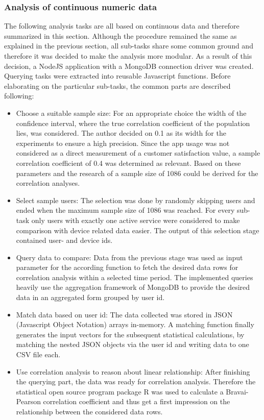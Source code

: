 \subsubsection{Analysis of continuous numeric data}
The following analysis tasks are all based on continuous data and therefore summarized in this section. Although the procedure remained the same as explained in the previous section, all sub-tasks share some common ground and therefore it was decided to make the analysis more modular. As a result of this decision, a NodeJS application with a MongoDB connection driver was created. Querying tasks were extracted into reusable Javascript functions. Before elaborating on the particular sub-tasks, the common parts are described following:

\begin{itemize}
	\item Choose a suitable sample size: For an appropriate choice the width of the confidence interval, where the true correlation coefficient of the population lies, was considered. The author decided on 0.1 as its width for the experiments to ensure a high precision. Since the app usage was not considered as a direct measurement of a customer satisfaction value, a sample correlation coefficient of 0.4 was determined as relevant. Based on these parameters and the research of \cite{moinester2014sample} a sample size of 1086 could be derived for the correlation analyses. 
	\item Select sample users: The selection was done by randomly skipping users and ended when the maximum sample size of 1086 was reached. For every sub-task only users with exactly one active service were considered to make comparison with device related data easier. The output of this selection stage contained user- and device ids.
	\item Query data to compare: Data from the previous stage was used as input parameter for the according function to fetch the desired data rows for correlation analysis within a selected time period. The implemented queries heavily use the aggregation framework of MongoDB to provide the desired data in an aggregated form grouped by user id. 
	\item Match data based on user id: The data collected was stored in JSON (Javascript Object Notation) arrays in-memory. A matching function finally generates the input vectors for the subsequent statistical calculations, by matching the nested JSON objects via the user id and writing data to one CSV file each. 
	\item Use correlation analysis to reason about linear relationship: After finishing the querying part, the data was ready for correlation analysis. Therefore the statistical open source program package R was used to calculate a Bravai-Pearson correlation coefficient and thus get a first impression on the relationship between the considered data rows.  
\end{itemize}

